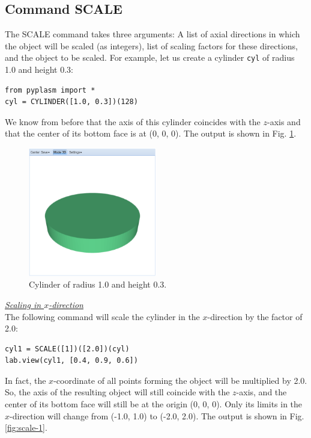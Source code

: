 \documentclass[article,A4,12pt]{llncs}
\begin{document}
\subsection{Command SCALE}

The SCALE command takes three arguments: A list of axial directions in which 
the object will be scaled (as integers), list of scaling factors for these 
directions, and the object to be scaled. For example, let us create a cylinder 
{\tt cyl} of radius 1.0 and height 0.3:

\begin{verbatim}
from pyplasm import *
cyl = CYLINDER([1.0, 0.3])(128)
\end{verbatim}
We know from before that the axis of this cylinder coincides with the $z$-axis 
and that the center of its bottom face is at (0, 0, 0). The output is shown in Fig. \ref{fig:scale-0}.

\newpage

\begin{figure}[!ht]
\begin{center}
\includegraphics[width=0.5\textwidth]{img/scale-0.png}
\end{center}
\vspace{-2mm}
\caption{Cylinder of radius 1.0 and height 0.3.}
\label{fig:scale-0}
\end{figure}

\noindent
\underline{\em Scaling in $x$-direction}\\

The following command will 
scale the cylinder in the $x$-direction by the factor of 2.0: 

\begin{verbatim}
cyl1 = SCALE([1])([2.0])(cyl)
lab.view(cyl1, [0.4, 0.9, 0.6])
\end{verbatim}
In fact, the $x$-coordinate of all points forming 
the object will be multiplied by 2.0. So, the axis of the resulting object will still
coincide with the $z$-axis, and the center of its bottom face will
still be at the origin (0, 0, 0). Only its limits in the $x$-direction will change 
from (-1.0, 1.0) to (-2.0, 2.0).
The output is shown in Fig. \ref{fig:scale-1}.
\end{document}
